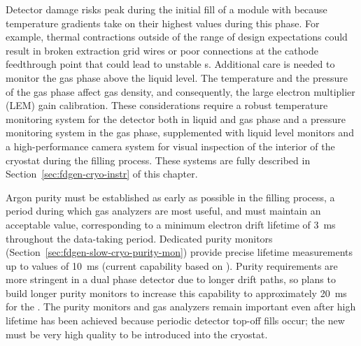 Detector damage risks peak during the initial fill of a module with \lar because temperature gradients take on their highest values during this phase.  For example, thermal contractions outside of the range of design expectations could result in broken extraction grid wires or poor connections at the cathode  feedthrough point that could lead to unstable \efield{}s. 
Additional care is needed to monitor the
gas phase above the liquid level. The temperature and the pressure of the gas phase affect gas density, and consequently, the large electron multiplier (LEM) gain calibration. These considerations require a robust temperature monitoring system for the detector both in liquid and gas phase and a pressure monitoring system in the gas phase,  
supplemented with liquid level monitors and a high-performance camera system for visual inspection of the interior of the cryostat during the filling process.  These systems are fully described in Section~\ref{sec:fdgen-cryo-instr} of this chapter.
 
Argon purity must be established as early as possible in the filling process, a period during which gas analyzers are most useful, and must maintain an acceptable value, corresponding to a minimum electron drift lifetime of \SI{3}{ms} %
throughout the data-taking period. Dedicated purity monitors (Section~\ref{sec:fdgen-slow-cryo-purity-mon}) provide precise lifetime measurements up to values of \SI{10}{ms} (current capability based on ). Purity requirements are more stringent in a dual phase detector due to longer drift paths, so  plans to build longer purity monitors to increase this capability to approximately \SI{20}{ms} for the  .
The purity monitors and gas analyzers remain important even after high lifetime has been achieved because periodic detector top-off  fills occur; the new \lar must be very high quality to be introduced into the cryostat.
 
